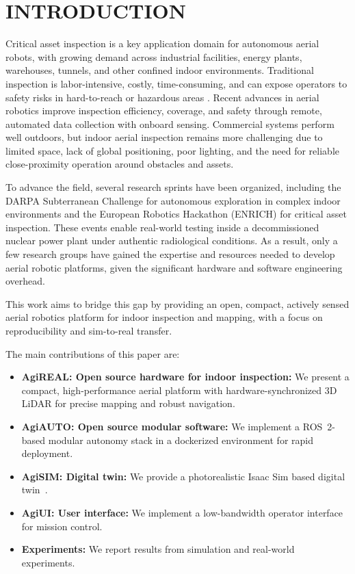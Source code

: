 \documentclass[letterpaper, 10 pt, conference]{ieeeconf}  %
\newcommand{\Agiautonomy}{AgiAUTO}
\newcommand{\Agisim}{AgiSIM}
\newcommand{\Agiui}{AgiUI}
\newcommand{\Agihw}{AgiREAL}
\begin{document}
\section{INTRODUCTION}\label{sec:introduction}

Critical asset inspection is a key application domain for autonomous aerial robots, with growing demand across industrial facilities, energy plants, warehouses, tunnels, and other confined indoor environments. Traditional inspection is labor-intensive, costly, time-consuming, and can expose operators to safety risks in hard-to-reach or hazardous areas \cite{sanchez2024toward}. Recent advances in aerial robotics improve inspection efficiency, coverage, and safety through remote, automated data collection with onboard sensing. Commercial systems perform well outdoors, but indoor aerial inspection remains more challenging due to limited space, lack of global positioning, poor lighting, and the need for reliable close-proximity operation around obstacles and assets.

To advance the field, several research sprints have been organized, including the DARPA Subterranean Challenge \cite{tranzatto2022cerberus} for autonomous exploration in complex indoor environments and the European Robotics Hackathon (ENRICH) \cite{europeanroboticsENRICH2025} for critical asset inspection. These events enable real-world testing inside a decommissioned nuclear power plant under authentic radiological conditions. As a result, only a few research groups \cite{tranzatto2022cerberus, Foehn2022Agilicious, microswarm2022fast} have gained the expertise and resources needed to develop aerial robotic platforms, given the significant hardware and software engineering overhead.


This work aims to bridge this gap by providing an open, compact, actively sensed aerial robotics platform for indoor inspection and mapping, with a focus on reproducibility and sim-to-real transfer.


The main contributions of this paper are:
\begin{itemize}
        \item \textbf{\Agihw: Open source hardware for indoor inspection:} We present a compact, high-performance aerial platform with hardware-synchronized 3D LiDAR for precise mapping and robust navigation.
        \item \textbf{\Agiautonomy: Open source modular software:} We implement a ROS~2-based modular autonomy stack in a dockerized environment for rapid deployment.
        \item \textbf{\Agisim: Digital twin:} We provide a photorealistic Isaac Sim based digital twin~\cite{nvidiaIsaacSim2026}.
        \item \textbf{\Agiui: User interface:} We implement a low-bandwidth operator interface for mission control.
        \item \textbf{Experiments:} We report results from simulation and real-world experiments.
\end{itemize}
\end{document}
